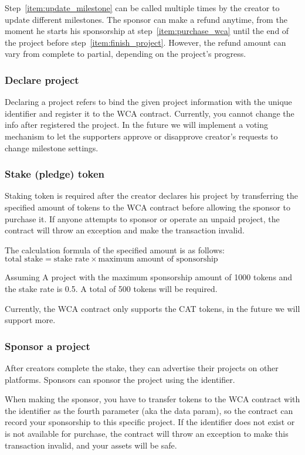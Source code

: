 Step~\ref{item:update_milestone} can be called multiple times by the creator
to update different milestones.
The sponsor can make a refund anytime, from the moment he starts his sponsorship
at step~\ref{item:purchase_wca} until the end of the project before
step~\ref{item:finish_project}.
However, the refund amount can vary from complete to partial, depending on
the project's progress.

\subsubsection{Declare project}

Declaring a project refers to bind the given project information with the
unique identifier and register it to the WCA contract.
Currently, you cannot change the info after registered the project.
In the future we will implement a voting mechanism to let the supporters approve
or disapprove creator's requests to change milestone settings.

\subsubsection{Stake (pledge) token}

Staking token is required after the creator declares his project by transferring
the specified amount of tokens to the WCA contract before allowing the sponsor
to purchase it.
If anyone attempts to sponsor or operate an unpaid project, the contract will
throw an exception and make the transaction invalid.

The calculation formula of the specified amount is as follows:
$\text{total stake} = \text{stake rate} \times \text{maximum amount of sponsorship}$

Assuming A project with the maximum sponsorship amount of 1000 tokens and
the stake rate is 0.5. A total of 500 tokens will be required.

Currently, the WCA contract only supports the CAT tokens, in the future we will
support more.

\subsubsection{Sponsor a project}

After creators complete the stake, they can advertise their projects on other
platforms.
Sponsors can sponsor the project using the identifier.

When making the sponsor, you have to transfer tokens to the WCA contract with
the identifier as the fourth parameter (aka the data param), so the contract
can record your sponsorship to this specific project.
If the identifier does not exist or is not available for purchase, the contract
will throw an exception to make this transaction invalid, and your assets will be safe.

